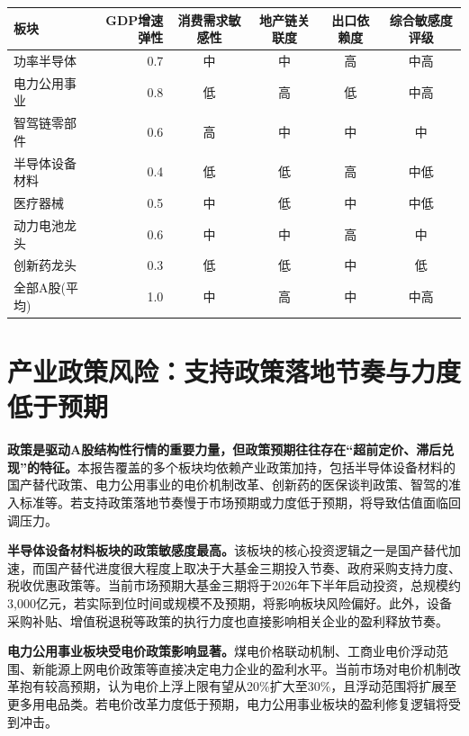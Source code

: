\begin{exhibitbox}[图表10-1：核心板块对宏观经济波动的敏感度矩阵]
\scriptsize
\setlength{\tabcolsep}{3.5pt}
\begin{tabularx}{\linewidth}{X r c c c c}
\toprule
\textbf{板块} & \textbf{GDP增速弹性} & \textbf{消费需求敏感性} & \textbf{地产链关联度} & \textbf{出口依赖度} & \textbf{综合敏感度评级} \\
\midrule
功率半导体 & 0.7 & 中 & 中 & 高 & \textcolor{riskamber}{中高} \\
电力公用事业 & 0.8 & 低 & 高 & 低 & \textcolor{riskamber}{中高} \\
智驾链零部件 & 0.6 & 高 & 中 & 中 & \textcolor{steelgrey}{中} \\
半导体设备材料 & 0.4 & 低 & 低 & 高 & \textcolor{riskgreen}{中低} \\
医疗器械 & 0.5 & 中 & 低 & 中 & \textcolor{riskgreen}{中低} \\
动力电池龙头 & 0.6 & 中 & 中 & 高 & \textcolor{riskamber}{中} \\
创新药龙头 & 0.3 & 低 & 低 & 中 & \textcolor{riskgreen}{低} \\
\midrule
全部A股(平均) & 1.0 & 中 & 高 & 中 & \textcolor{riskred}{中高} \\
\bottomrule
\end{tabularx}
\vspace{0.2cm}
\end{exhibitbox}

\section{产业政策风险：支持政策落地节奏与力度低于预期}

\textbf{政策是驱动A股结构性行情的重要力量，但政策预期往往存在“超前定价、滞后兑现”的特征。}本报告覆盖的多个板块均依赖产业政策加持，包括半导体设备材料的国产替代政策、电力公用事业的电价机制改革、创新药的医保谈判政策、智驾的准入标准等。若支持政策落地节奏慢于市场预期或力度低于预期，将导致估值面临回调压力。

\textbf{半导体设备材料板块的政策敏感度最高。}该板块的核心投资逻辑之一是国产替代加速，而国产替代进度很大程度上取决于大基金三期投入节奏、政府采购支持力度、税收优惠政策等。当前市场预期大基金三期将于2026年下半年启动投资，总规模约3,000亿元，若实际到位时间或规模不及预期，将影响板块风险偏好。此外，设备采购补贴、增值税退税等政策的执行力度也直接影响相关企业的盈利释放节奏。

\textbf{电力公用事业板块受电价政策影响显著。}煤电价格联动机制、工商业电价浮动范围、新能源上网电价政策等直接决定电力企业的盈利水平。当前市场对电价机制改革抱有较高预期，认为电价上浮上限有望从20\%扩大至30\%，且浮动范围将扩展至更多用电品类。若电价改革力度低于预期，电力公用事业板块的盈利修复逻辑将受到冲击。

